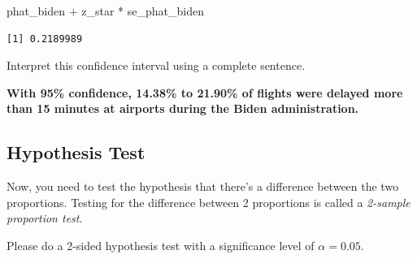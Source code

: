 \documentclass[
  letterpaper,
  DIV=11,
  numbers=noendperiod]{scrartcl}
\newenvironment{Shaded}{\begin{snugshade}}{\end{snugshade}}
\newcommand{\NormalTok}[1]{\textcolor[rgb]{0.00,0.23,0.31}{#1}}
\newcommand{\SpecialCharTok}[1]{\textcolor[rgb]{0.37,0.37,0.37}{#1}}
\begin{document}
\begin{Shaded}
\begin{Highlighting}[]
\NormalTok{phat\_biden }\SpecialCharTok{+}\NormalTok{ z\_star }\SpecialCharTok{*}\NormalTok{ se\_phat\_biden}
\end{Highlighting}
\end{Shaded}

\begin{verbatim}
[1] 0.2189989
\end{verbatim}

Interpret this confidence interval using a complete sentence.

\begin{tcolorbox}[enhanced jigsaw, colback=white, breakable, arc=.35mm, left=2mm, colframe=quarto-callout-warning-color-frame, opacityback=0, rightrule=.15mm, toprule=.15mm, bottomrule=.15mm, leftrule=.75mm]

\textbf{With 95\% confidence, 14.38\% to 21.90\% of flights were delayed
more than 15 minutes at airports during the Biden administration.}

\end{tcolorbox}

\subsection{Hypothesis Test}\label{hypothesis-test}

Now, you need to test the hypothesis that there's a difference between
the two proportions. Testing for the difference between 2 proportions is
called a \emph{2-sample proportion test}.

Please do a 2-sided hypothesis test with a significance level of
\(\alpha=0.05\).
\end{document}
